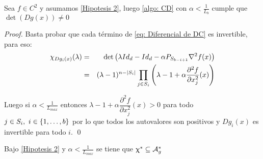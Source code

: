 \begin{proposition}
	\label{prop: DC es difeo local}
	Sea $f \in C^2$ y asumamos \ref{Hipotesis 2}, luego \ref{algo: CD} con $\alpha < \frac{1}{L_b}$ cumple que $\det(Dg(x)) \neq 0$
\end{proposition}

\begin{proof}
	Basta probar que cada t\'ermino de \ref{eq: Diferencial de DC} es invertible, para eso:
	\begin{equation*}
	\begin{aligned}
	\chi_{Dg_i(x)}(\lambda) & = & \det\left(
			\lambda Id_d - Id_d - \alpha P_{S_{b-i+1}}\nabla ^2 f(x)
		\right) \\
		& = & (\lambda -1)^{n-\left\lvert S_i\right\rvert}\prod\limits_{j \in S_i}{\left(\lambda -1 + \alpha\dfrac{\partial^2 f}{\partial x_j^2}(x) \right)}
	\end{aligned}
	\end{equation*}
	
	Luego si $\alpha < \frac{1}{L_{max}}$ entonces $\lambda -1 + \alpha\dfrac{\partial^2 f}{\partial x_j^2}(x) > 0$ para todo $j \in S_i, \ i \in \left\lbrace1, \dots, b\right\rbrace$ por lo que todos los autovalores son positivos y $Dg_i(x)$ es invertible para todo $i$. \qed
	
\end{proof}

\begin{proposition}
	\label{prop: DC los puntos silla estrictos son fijos inestables}
	Bajo \ref{Hipotesis 2} y $\alpha < \frac{1}{L_{max}}$ se tiene que $\upchi^* \subseteq \mathcal{A}_{g}^{*}$
\end{proposition}

